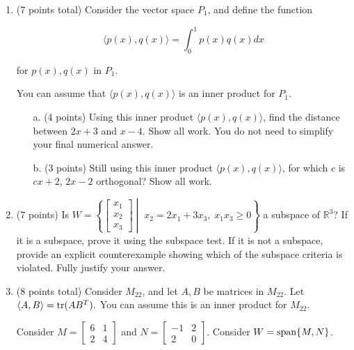 \documentclass[12pt]{extarticle}
\begin{document}
\begin{enumerate}
\begin{itemize}
 \end{itemize}

 \newpage
 

\item (7 points total) Consider the vector space $P_1$, and define the function

$$\langle p(x),q(x)\rangle=\int_0^1p(x)q(x) dx$$

for $p(x),q(x) $ in $P_1$.

You can assume that $\langle p(x),q(x)\rangle$ is an inner product for $P_1$.


\begin{itemize}
\item[a.] (4 points) Using this inner product $\langle p(x),q(x)\rangle$, find the distance between $2x+3$ and $x-4$. Show all work. You do not need to simplify your final numerical answer.

\vfill
\item[b.] (3 points) Still using this inner product $\langle p(x),q(x)\rangle$, for which $c$ is $cx+2$, $2x-2$ orthogonal?   Show all work.


\vfill



\end{itemize}



\newpage

    
\item (7 points) Is $W=\left\{\begin{bmatrix} x_1 \\x_2\\ x_3\end{bmatrix}\middle|\; x_2=2x_1+3x_3,\;  x_1x_3\geq 0\right\}$ a subspace of $\mathbb{R}^3$? If it is a subspace, prove it using the subspace test. If it is not a subspace, provide an explicit counterexample showing which of the subspace criteria is violated. Fully justify your answer.


\newpage







\item (8 points total) Consider $M_{22}$, and let $A,B$ be matrices in $M_{22}$. Let
$\langle A,B\rangle=\operatorname{tr}(AB^T).$ You can assume this is an inner product for $M_{22}$.

Consider $M=\left[\begin{array}{cc}
6 & 1 
\\
 2 & 4 
\end{array}\right]$ and $N=\left[\begin{array}{cc}
-1 & 2 
\\
 2 & 0 
\end{array}\right]$. Consider $W=\operatorname{span}\{M, N\}$.


\end{enumerate}
\end{document}
